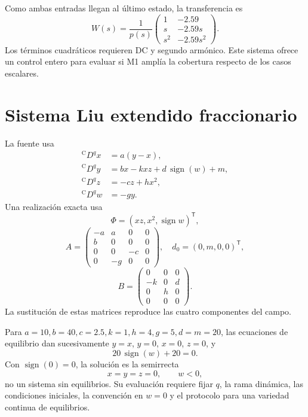 Como ambas entradas llegan al último estado, la transferencia es
\begin{equation}
 W(s)=\frac1{p(s)}
 \begin{pmatrix}
 1&-2.59\\
 s&-2.59s\\
 s^2&-2.59s^2
 \end{pmatrix}.
 \label{eq:cand-jerk-transfer}
\end{equation}
Los términos cuadráticos requieren DC y segundo armónico. Este sistema ofrece
un control entero para evaluar si M1 amplía la cobertura respecto de los casos
escalares.

\section{Sistema Liu extendido fraccionario}
\label{sec:cand-extended-liu}

La fuente \cite{wang2020} usa
\begin{equation}
\begin{aligned}
 {}^{\mathrm C}D^q x&=a(y-x),\\
 {}^{\mathrm C}D^q y&=bx-kxz+d\,\operatorname{sign}(w)+m,\\
 {}^{\mathrm C}D^q z&=-cz+hx^2,\\
 {}^{\mathrm C}D^q w&=-gy.
\end{aligned}
\label{eq:cand-liu}
\end{equation}
Una realización exacta usa
\[
 \Phi=(xz,x^2,\operatorname{sign}w)^{\mathsf T},
\]
\[
 A=\begin{pmatrix}
 -a&a&0&0\\ b&0&0&0\\0&0&-c&0\\0&-g&0&0
 \end{pmatrix},\quad
 d_0=(0,m,0,0)^{\mathsf T},
\]
\[
 B=\begin{pmatrix}
 0&0&0\\-k&0&d\\0&h&0\\0&0&0
 \end{pmatrix}.
\]
La sustitución de estas matrices reproduce las cuatro componentes del campo.

Para \(a=10,b=40,c=2.5,k=1,h=4,g=5,d=m=20\), las ecuaciones de equilibrio
dan sucesivamente \(y=x\), \(y=0\), \(x=0\), \(z=0\), y
\[
 20\,\operatorname{sign}(w)+20=0.
\]
Con \(\operatorname{sign}(0)=0\), la solución es la semirrecta
\begin{equation}
 x=y=z=0,\qquad w<0,
 \label{eq:cand-liu-equilibria}
\end{equation}
no un sistema sin equilibrios. Su evaluación requiere fijar \(q\), la rama
dinámica, las condiciones iniciales, la convención en \(w=0\) y el protocolo
para una variedad continua de equilibrios.

